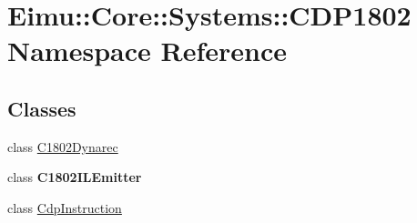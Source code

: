 \hypertarget{namespace_eimu_1_1_core_1_1_systems_1_1_c_d_p1802}{
\section{Eimu::Core::Systems::CDP1802 Namespace Reference}
\label{namespace_eimu_1_1_core_1_1_systems_1_1_c_d_p1802}
}
\subsection*{Classes}
\begin{DoxyCompactItemize}
\item 
class \hyperlink{class_eimu_1_1_core_1_1_systems_1_1_c_d_p1802_1_1_c1802_dynarec}{C1802Dynarec}
\item 
class {\bfseries C1802ILEmitter}
\item 
class \hyperlink{class_eimu_1_1_core_1_1_systems_1_1_c_d_p1802_1_1_cdp_instruction}{CdpInstruction}
\end{DoxyCompactItemize}
